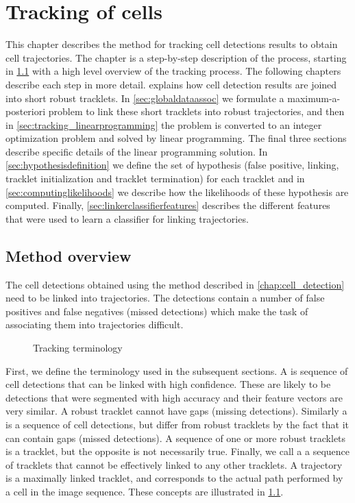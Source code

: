 \chapter{Tracking of cells \statusfirstdraft}
	\label{chap:tracking}
	
	This chapter describes the method for tracking cell detections results to obtain cell trajectories. The chapter is a step-by-step description of the process, starting in \cref{sec:tracking_overview} with a high level overview of the tracking process. The following chapters describe each step in more detail.  explains how cell detection results are joined into short robust tracklets. In \cref{sec:globaldataassoc} we formulate a maximum-a-posteriori problem to link these short tracklets into robust trajectories, and then in \cref{sec:tracking_linearprogramming} the problem is converted to an integer optimization problem and solved by linear programming. The final three sections describe specific details of the linear programming solution. In \cref{sec:hypothesisdefinition} we define the set of hypothesis (false positive, linking, tracklet initialization and tracklet termination) for each tracklet and in \cref{sec:computinglikelihoods} we describe how the likelihoods of these hypothesis are computed. Finally, \cref{sec:linkerclassifierfeatures} describes the different features that were used to learn a classifier for linking trajectories.
	
	\section{Method overview \statusfirstdraft}
		\label{sec:tracking_overview}
		
		The cell detections obtained using the method described in \cref{chap:cell_detection} need to be linked into trajectories. The detections contain a number of false positives and false negatives (missed detections) which make the task of associating them into trajectories difficult.
		
		\begin{figure}[h]
			\centering
			\caption{Tracking terminology}
			\label{fig:tracking_overview_terminology}
		\end{figure}
		
		First, we define the terminology used in the subsequent sections. A  is sequence of cell detections that can be linked with high confidence. These are likely to be detections that were segmented with high accuracy and their feature vectors are very similar. A robust tracklet cannot have gaps (missing detections). Similarly a  is a sequence of cell detections, but differ from robust tracklets by the fact that it can contain gaps (missed detections). A sequence of one or more robust tracklets is a tracklet, but the opposite is not necessarily true. Finally, we call a  a sequence of tracklets that cannot be effectively linked to any other tracklets. A trajectory is a maximally linked tracklet, and corresponds to the actual path performed by a cell in the image sequence. These concepts are illustrated in \cref{fig:tracking_overview_terminology}.
		
